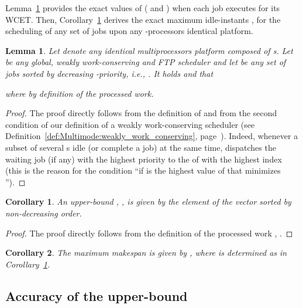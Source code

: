 \documentclass{article}
\newtheorem{validity test}{Validity Test}
\newtheorem{Lemma}{Lemma}
\newtheorem{proof}{Proof}
\newtheorem{Corollary}{Corollary}
\begin{document}
Lemma~\ref{lem:Multimode:ident_FTP_processed_work} provides the exact values of  ( and ) when each job executes for its WCET. Then, Corollary~\ref{cor:Multimode:ident_FTP_maxidle} derives the exact maximum idle-instants  , for the scheduling of any set  of  jobs upon any -processors identical platform. 

\begin{Lemma}
\label{lem:Multimode:ident_FTP_processed_work}
Let  denote any identical multiprocessors platform composed of  s. Let  be any global, weakly work-conserving and FTP scheduler and let  be any set of  jobs sorted by decreasing -priority, i.e., . It holds  and  that

\begin{small}

\end{small}
where   by definition of the processed work.
\end{Lemma} 
\begin{proof}
The proof directly follows from the definition of   and from the second condition of our definition of a weakly work-conserving scheduler (see Definition~\ref{def:Multimode:weakly_work_conserving}, page~\pageref{def:Multimode:weakly_work_conserving}). Indeed, whenever a subset  of several s idle (or complete a job) at the same time,  dispatches the waiting job (if any) with the highest priority to the  of  with the highest index (this is the reason for the condition ``if  is the highest value of  that minimizes ''). 
\end{proof}

\begin{Corollary}
\label{cor:Multimode:ident_FTP_maxidle}
An upper-bound , , is given by the  element of the vector  sorted by non-decreasing order.
\end{Corollary} 
\begin{proof}
The proof directly follows from the definition of the processed work , . 
\end{proof}

\begin{Corollary}
\label{cor:Multimode:ident_FTP_makespan}
The maximum makespan  is given by , where  is determined as in Corollary~\ref{cor:Multimode:ident_FTP_maxidle}. 
\end{Corollary}

\subsection{Accuracy of the upper-bound }
\label{sec:FTP_Accuracy}
\end{document}
